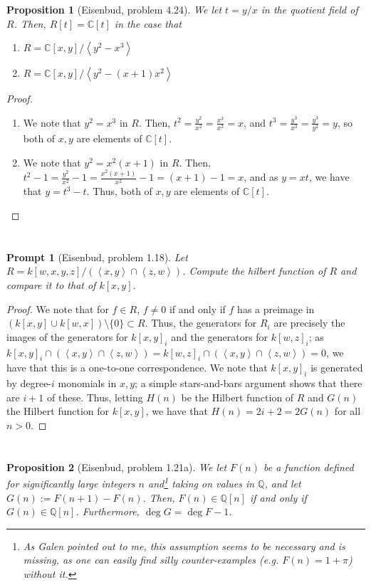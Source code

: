 \documentclass[english]{article}
\newcommand{\CC}{\mathbb{C}}
\newcommand{\QQ}{\mathbb{Q}}
\newcommand{\prob}[1]{\setcounter{section}{#1-1}\section{}}
\newtheorem*{prop*}{Proposition}
\newtheorem*{prompt*}{Prompt}
\theoremstyle{remark}
\theoremstyle{definition}
\newcommand{\idl}[1]{\left\langle{#1}\right\rangle }
\begin{document}
%
%
\prob{15}
\begin{prop*}[Eisenbud, problem 4.24]
	We let $t=y/x$ in the quotient field of $R$. Then, $R[t]=\CC[t]$ in the case that \begin{enumerate}[label=\emph{(\roman*)}]
		\item $R=\CC[x,y]/\idl{y^2-x^3}$
		\item $R=\CC[x,y]/\idl{y^2-(x+1)x^2}$
	\end{enumerate}
\end{prop*}
\begin{proof}
\begin{enumerate}[label=\emph{(\roman*)}]
	\item We note that $y^2=x^3$ in $R$. Then, $t^2=\frac{y^2}{x^2}=\frac{x^3}{x^2}=x$, and $t^3=\frac{y^3}{x^3}=\frac{y^3}{y^2}=y$, so both of $x,y$ are elements of $\CC[t]$. 
	\item We note that $y^2=x^2(x+1)$ in $R$. Then, $t^2-1=\frac{y^2}{x^2}-1=\frac{x^2(x+1)}{x^2}-1=(x+1)-1=x$, and as $y=xt$, we have that $y=t^3-t$. Thus, both of $x,y$ are elements of $\CC[t]$.
\end{enumerate}
\end{proof}
%
%
%
\prob{17}\begin{prompt*}[Eisenbud, problem 1.18]
	Let $R=k[w,x,y,z]/\left(\idl{x,y}\cap\idl{z,w}\right)$. Compute the hilbert function of $R$ and compare it to that of $k[x,y]$.
\end{prompt*}
\begin{proof}
We note that for $f\in R$, $f\neq 0$ if and only if $f$ has a preimage in $\left(k[x,y]\cup k[w,x]\right)\setminus{\{0\}}\subset R$. Thus, the generators for $R_i$ are precisely the images of the generators for $k[x,y]_i$  and the generators for $k[w,z]_i$; as $k[x,y]_i\cap \left(\idl{x,y}\cap\idl{z,w}\right)=k[w,z]_i\cap \left(\idl{x,y}\cap\idl{z,w}\right)=0$, we have that this is a one-to-one correspondence. We note that $k[x,y]_i$ is generated by degree-$i$ monomials in $x,y$; a simple stars-and-bars argument shows that there are $i+1$ of these. Thus, letting $H(n)$ be the Hilbert function of $R$ and $G(n)$ the Hilbert function for $k[x,y]$, we have that $H(n)=2i+2=2G(n)$ for all $n>0$.
\end{proof}%
%
%
%
\prob{18}\begin{prop*}[Eisenbud, problem 1.21a]
	We let $F(n)$ be a function defined for significantly large integers $n$ and\footnote{As Galen pointed out to me, this assumption seems to be necessary and is missing, as one can easily find silly counter-examples (e.g. $F(n)=1+\pi$) without it.} taking on values in $\QQ$, and let $G(n):=F(n+1)-F(n)$. Then, $F(n)\in \QQ[n]$ if and only if $G(n)\in \QQ[n]$. Furthermore, $\deg G=\deg F-1$.
\end{prop*}
\end{document}
